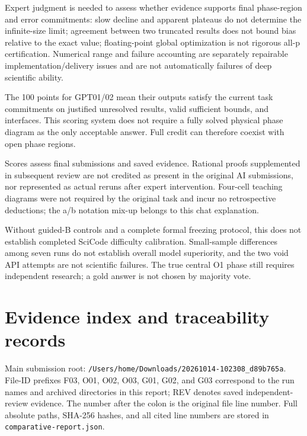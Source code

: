 \documentclass[11pt,a4paper]{article}
\begin{document}
Expert judgment is needed to assess whether evidence supports final phase-region and error commitments: slow decline and apparent plateaus do not determine the infinite-size limit; agreement between two truncated results does not bound bias relative to the exact value; floating-point global optimization is not rigorous all-p certification. Numerical range and failure accounting are separately repairable implementation/\allowbreak{}delivery issues and are not automatically failures of deep scientific ability.

The 100 points for GPT01/\allowbreak{}02 mean their outputs satisfy the current task commitments on justified unresolved results,\allowbreak{} valid sufficient bounds,\allowbreak{} and interfaces. This scoring system does not require a fully solved physical phase diagram as the only acceptable answer. Full credit can therefore coexist with open phase regions.

Scores assess final submissions and saved evidence. Rational proofs supplemented in subsequent review are not credited as present in the original AI submissions,\allowbreak{} nor represented as actual reruns after expert intervention. Four-cell teaching diagrams were not required by the original task and incur no retrospective deductions; the a/\allowbreak{}b notation mix-up belongs to this chat explanation.

Without guided-B controls and a complete formal freezing protocol,\allowbreak{} this does not establish completed SciCode difficulty calibration. Small-sample differences among seven runs do not establish overall model superiority,\allowbreak{} and the two void API attempts are not scientific failures. The true central O1 phase still requires independent research; a gold answer is not chosen by majority vote.

\clearpage
\appendix
\section{Evidence index and traceability records}
Main submission root: \nolinkurl{/Users/home/Downloads/20261014-102308_d89b765a}. File-ID prefixes F03,\allowbreak{} O01,\allowbreak{} O02,\allowbreak{} O03,\allowbreak{} G01,\allowbreak{} G02,\allowbreak{} and G03 correspond to the run names and archived directories in this report; REV denotes saved independent-review evidence. The number after the colon is the original file line number. Full absolute paths,\allowbreak{} SHA-256 hashes,\allowbreak{} and all cited line numbers are stored in \nolinkurl{comparative-report.json}. 
\end{document}

